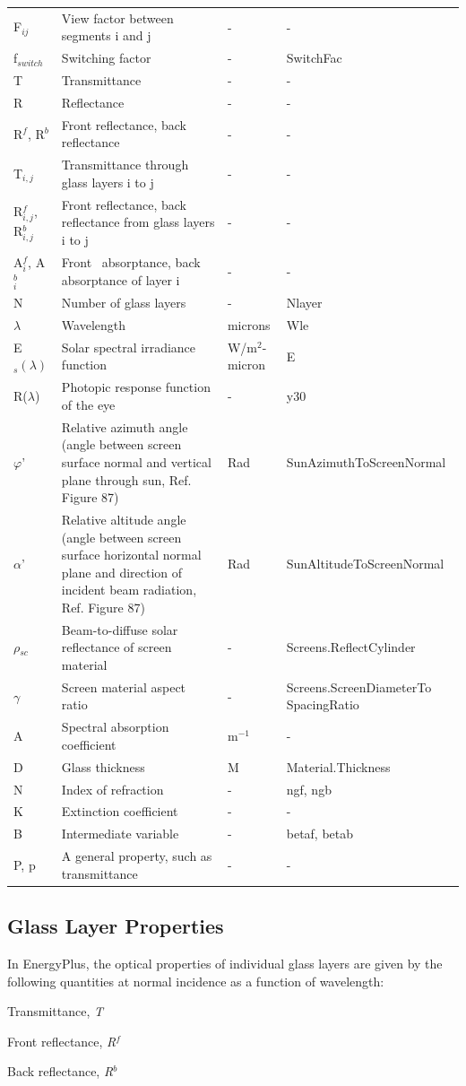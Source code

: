 \begin{longtable}[c]{p{1.0in}p{2.5in}p{1.0in}p{1.5in}}
F\(_{ij}\) & View factor between segments i and j & - & - \tabularnewline
f\(_{switch}\) & Switching factor & - & SwitchFac \tabularnewline
T & Transmittance & - & - \tabularnewline
R & Reflectance & - & - \tabularnewline
R\(^f\), R\(^b\) & Front reflectance, back reflectance & - & - \tabularnewline
T\(_{i,j}\) & Transmittance through glass layers i to j & - & - \tabularnewline
R\(^f_{i,j}\), R\(^b_{i,j}\) & Front reflectance, back reflectance from glass layers i to j & - & - \tabularnewline
A\(^f_i\), A\(^b_i\) & Front~ absorptance, back absorptance of layer i & - & - \tabularnewline
N & Number of glass layers & - & Nlayer \tabularnewline
\(\lambda\) & Wavelength & microns & Wle \tabularnewline
E\(_s (\lambda)\) & Solar spectral irradiance function & W/m\(^2\)-micron & E \tabularnewline
R($\lambda$) & Photopic response function of the eye & - & y30 \tabularnewline
$\varphi$' & Relative azimuth angle (angle between screen surface normal and vertical plane through sun, Ref. Figure 87) & Rad & SunAzimuthToScreenNormal \tabularnewline
$\alpha$' & Relative altitude angle (angle between screen surface horizontal normal plane and direction of incident beam radiation, Ref. Figure 87) & Rad & SunAltitudeToScreenNormal \tabularnewline
$\rho$\(_{sc}\) & Beam-to-diffuse solar reflectance of screen material & - & Screens.ReflectCylinder \tabularnewline
$\gamma$ & Screen material aspect ratio & - & Screens.ScreenDiameterTo SpacingRatio \tabularnewline
Α & Spectral absorption coefficient & m\(^{-1}\) & - \tabularnewline
D & Glass thickness & M & Material.Thickness \tabularnewline
N & Index of refraction & - & ngf, ngb \tabularnewline
Κ & Extinction coefficient & - & - \tabularnewline
Β & Intermediate variable & - & betaf, betab \tabularnewline
P, p & A general property, such as transmittance & - & - \tabularnewline
\bottomrule
\end{longtable}

\subsection{Glass Layer Properties}\label{glass-layer-properties}

In EnergyPlus, the optical properties of individual glass layers are given by the following quantities at normal incidence as a function of wavelength:

Transmittance, \emph{T}

Front reflectance, \emph{R\(^{f}\)}

Back reflectance, \emph{R\(^{b}\)}

